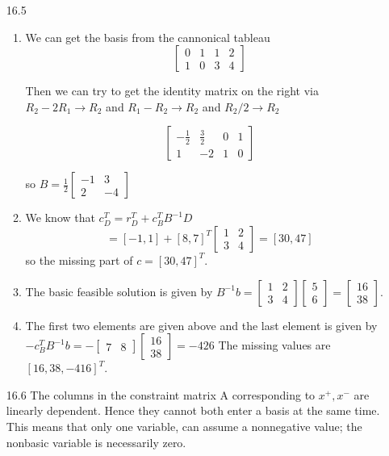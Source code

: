 \documentclass[10pt,a4paper]{article}
\newcommand\m[1]{\begin{bmatrix}#1\end{bmatrix}}
\begin{document}
\begin{enumerate}
    \item [16.5] \begin{enumerate}
        \item We can get the basis from the cannonical tableau 
        $$\m{ 0 & 1 & 1 & 2 \\ 1 & 0 & 3 & 4 }$$

        Then we can try to get the identity matrix on the right via $R_2 - 2R_1 \rightarrow R_2$ and $R_1 - R_2 \rightarrow R_2$ and $R_2 / 2 \rightarrow R_2$

        $$\m{-\frac{1}{2} & \frac{3}{2} & 0 & 1 \\ 1 & -2 & 1 & 0}$$
        
        so $B  = \frac{1}{2}\m{-1 & 3 \\ 2 & -4}$

        \item We know that $c_D^T = r_D^T + c_B^TB^{-1}D$ 
        $$ = [-1, 1] + [8, 7]^T \m{1 & 2 \\ 3 & 4} = [30, 47]$$ 
        so the missing part of $c = [30, 47]^T$.
        \item The basic feasible solution is given by $B^{-1}b = \m{1 & 2 \\ 3 & 4} \m{5 \\ 6} = \m{16 \\ 38}$.
        \item The first two elements are given above and the last element is given by $-c_B^TB^{-1}b = - \m{7 & 8}\m{16 \\ 38} = -426$
        The missing values are $[16, 38, −416]^T$.
        
    \end{enumerate}


    \item [16.6] The columns in the constraint matrix A corresponding to $x^+, x^-$
    are linearly dependent. Hence they
    cannot both enter a basis at the same time. This means that only one variable, can assume a
    nonnegative value; the nonbasic variable is necessarily zero.
    

\end{enumerate}
\end{document}
